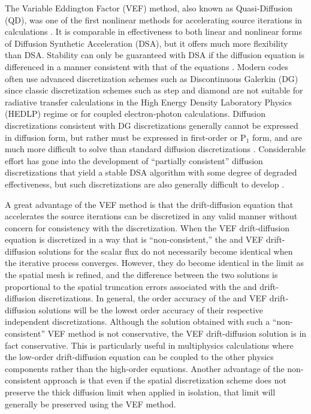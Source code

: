 The Variable Eddington Factor (VEF) method, also known as Quasi-Diffusion (QD), was one of the first nonlinear methods 
for accelerating source iterations in \SN calculations \cite{AL,mihalas,goldin}.  It is comparable in effectiveness to both linear 
and nonlinear forms of Diffusion Synthetic Acceleration (DSA), but it offers much more flexibility than DSA.   
Stability can only be guaranteed with DSA if the diffusion equation is differenced in a manner consistent with that 
of the \SN equations \cite{A}. Modern \SN codes often use advanced discretization schemes such as Discontinuous 
Galerkin (DG) since classic discretization schemes such as step and diamond are not suitable for radiative transfer 
calculations in the High Energy Density Laboratory Physics (HEDLP) regime or for coupled electron-photon calculations.  
Diffusion discretizations consistent 
with DG \SN discretizations generally cannot be expressed in diffusion form, but rather must be expressed in 
first-order or P$_1$ form, and are much more difficult to solve than standard diffusion discretizations \cite{WWM}.  Considerable 
effort has gone into the development of ``partially consistent'' diffusion discretizations that yield a stable DSA 
algorithm with some degree of degraded effectiveness, but such discretizations are also generally difficult to develop \cite{ML,AM,WR}. 

A great advantage of the VEF method is that the drift-diffusion equation that accelerates the \SN source iterations can be 
discretized in any valid manner without concern for consistency with the \SN discretization.  When the VEF 
drift-diffusion equation is discretized in a way that is ``non-consistent,'' the \SN and VEF drift-diffusion solutions 
for the scalar flux do not necessarily become identical when the iterative process converges.  However, they do become 
identical in the limit as the spatial mesh is refined, and the difference between the two solutions is proportional to 
the spatial truncation errors associated with the \SN and drift-diffusion discretizations.  In general, the order accuracy 
of the \SN and VEF drift-diffusion solutions will be the lowest order accuracy of their respective independent 
discretizations.  Although the \SN solution obtained with such a ``non-consistent'' VEF method is not conservative, 
the VEF drift-diffusion solution is in fact conservative.  This is particularly useful in multiphysics calculations 
where the low-order drift-diffusion equation can be coupled to the other physics components rather than the high-order \SN 
equations.  Another advantage of the non-consistent approach is that even if the \SN spatial discretization 
scheme does not preserve the thick diffusion limit \cite{LMM} when applied in isolation, that limit will generally be 
preserved using the VEF method. 
 
